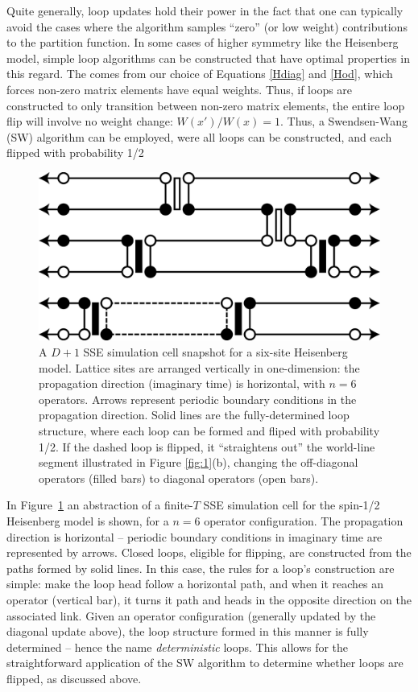 \documentclass[vecphys]{svmult}
\begin{document}
Quite generally, loop updates hold their power in the fact that one can typically avoid the cases where the algorithm samples ``zero'' (or low weight) contributions to the partition function.  In some cases of higher symmetry like the Heisenberg model, simple loop algorithms can be constructed that have optimal properties in this regard.  The comes from our choice of Equations \ref{Hdiag} and \ref{Hod}, which forces non-zero matrix elements have equal weights.  Thus, if loops are constructed to only transition between non-zero matrix elements, the entire loop flip will involve no weight change: $W(x')/W(x) = 1$.  Thus, a Swendsen-Wang (SW) algorithm can be employed, were
all loops can be constructed, and each flipped with probability 1/2 \cite{Melko:Swendsen88}

\begin{figure}[t]
\centering
\includegraphics*[width=.9\textwidth]{finiteT_heis.eps}
\caption[]{A $D+1$ SSE simulation cell snapshot for a six-site Heisenberg model.  Lattice sites are arranged vertically in one-dimension: the propagation direction (imaginary time) is horizontal, with $n=6$ operators.  Arrows represent periodic boundary conditions in the propagation direction.  Solid lines are the fully-determined loop structure, where each loop can be formed and fliped with probability 1/2.  If the dashed loop is flipped, it ``straightens out'' the world-line segment illustrated in Figure \ref{fig:1}(b), changing the off-diagonal operators (filled bars) to diagonal operators (open bars).}
\label{fig:2}       %
\end{figure} 

In Figure~\ref{fig:2} an abstraction of a finite-$T$ SSE simulation cell for the spin-1/2 Heisenberg model is shown, for a $n=6$ operator configuration.  The propagation direction is horizontal -- periodic boundary conditions in imaginary time are represented by arrows.  Closed loops, eligible for flipping, are constructed from the  paths formed by solid lines.  In this case, the rules for a loop's construction are simple: make the loop head follow a horizontal path, and when it reaches an operator (vertical bar), it turns it path and heads in the opposite direction on the associated link.  Given an operator configuration (generally updated by the diagonal update above), the loop structure formed in this manner is fully determined -- hence the name {\it deterministic} loops.  
This allows for the straightforward application of the SW algorithm to determine whether loops are flipped, as discussed above.
\end{document}
